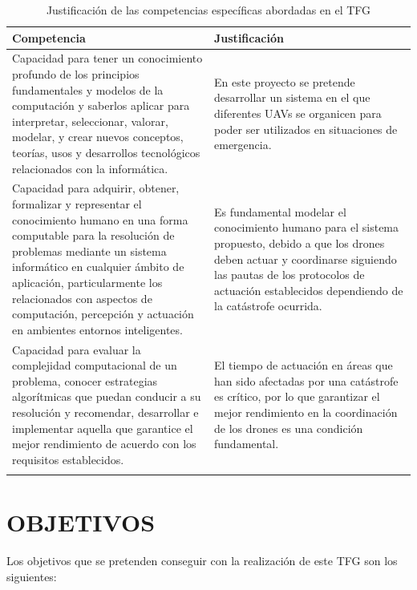 \documentclass{pre-tfg}
\begin{document}
\begin{table}[hp]
  \centering
  \caption{Justificación de las competencias específicas abordadas en el TFG}
  \label{tab:competencias}

  \begin{tabular}{p{0.5\linewidth}p{0.5\linewidth}}
    \textbf{Competencia} & \textbf{Justificación} \\
    \hline
   Capacidad para tener un conocimiento profundo de los principios fundamentales y
  modelos de la computación y saberlos aplicar para interpretar, seleccionar, valorar,
  modelar, y crear nuevos conceptos, teorías, usos y desarrollos tecnológicos relacionados
  con la informática. & En este proyecto se pretende desarrollar un sistema en el que diferentes  
UAVs se organicen para poder ser utilizados en situaciones de emergencia. \\
   Capacidad para adquirir, obtener, formalizar y representar el conocimiento humano en
  una forma computable para la resolución de problemas mediante un sistema informático en
  cualquier ámbito de aplicación, particularmente los relacionados con aspectos de
  computación, percepción y actuación en ambientes entornos inteligentes. & Es fundamental modelar el
conocimiento humano para el sistema propuesto, debido a que los drones deben actuar y coordinarse siguiendo las
pautas de los protocolos de actuación establecidos dependiendo de la catástrofe ocurrida. \\
   Capacidad para evaluar la complejidad computacional de un problema, conocer
  estrategias algorítmicas que puedan conducir a su resolución y recomendar, desarrollar e
  implementar aquella que garantice el mejor rendimiento de acuerdo con los requisitos
  establecidos. &  El tiempo de actuación en áreas que han sido afectadas por una catástrofe es crítico, por lo
 que garantizar el mejor rendimiento  en la coordinación de los drones es una condición fundamental.  \\
    & \\
    \hline
  \end{tabular}
\end{table}


\section{OBJETIVOS}

Los objetivos que se pretenden conseguir con la realización de este TFG son los siguientes:
\end{document}
